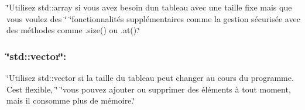 \char`\"{}\+Utilisez std\+::array si vous avez besoin d\textquotesingle{}un tableau avec une taille fixe mais que vous voulez des \char`\"{} \char`\"{}fonctionnalités supplémentaires comme la gestion sécurisée avec des méthodes comme .\+size() ou .\+at().\char`\"{}

\subsubsection*{\char`\"{}std\+::vector\char`\"{}\+:}

\char`\"{}\+Utilisez std\+::vector si la taille du tableau peut changer au cours du programme. C\textquotesingle{}est flexible, \char`\"{} \char`\"{}vous pouvez ajouter ou supprimer des éléments à tout moment, mais il consomme plus de mémoire.\char`\"{} 